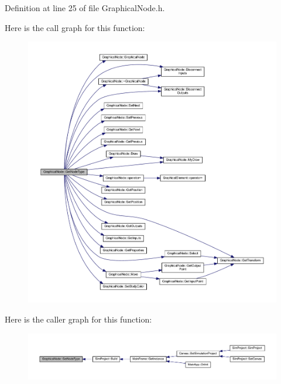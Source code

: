 Definition at line 25 of file Graphical\+Node.\+h.

Here is the call graph for this function\+:
\nopagebreak
\begin{figure}[H]
\begin{center}
\leavevmode
\includegraphics[width=350pt]{class_graphical_node_a4c5493ddcfca4d433421ae06eac1b19a_cgraph}
\end{center}
\end{figure}
Here is the caller graph for this function\+:
\nopagebreak
\begin{figure}[H]
\begin{center}
\leavevmode
\includegraphics[width=350pt]{class_graphical_node_a4c5493ddcfca4d433421ae06eac1b19a_icgraph}
\end{center}
\end{figure}
\mbox{\label{class_graphical_node_a5e0a98450d511bb024e1746ab42d34c4}} 
